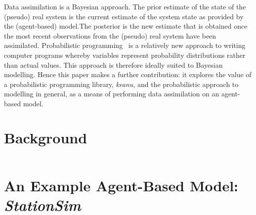 \documentclass[runningheads]{llncs}
\begin{document}
Data assimilation is a Bayesian approach. The prior estimate of the state of the (pseudo) real system is the current estimate of the system state as provided by the (agent-based) model.The posterior is the new estimate that is obtained once the most recent observations from the (pseudo) real system have been assimilated. Probabilistic programming~\cite{ghahramani_bayesian_2012,ghahramani_probabilistic_2015} is a relatively new approach to writing computer programs whereby variables represent probability distributions rather than actual values. This approach is therefore ideally suited to Bayesian modelling. Hence this paper makes a further contribution: it explores the value of a probabilistic programming library, \textit{keanu}, and the probabilistic approach to modelling in general, as a means of performing data assimilation on an agent-based model.




%
%
%
%
\section{Background}

$ $ %






\section{An Example Agent-Based Model: \textit{StationSim}}

$ $ %

\end{document}
